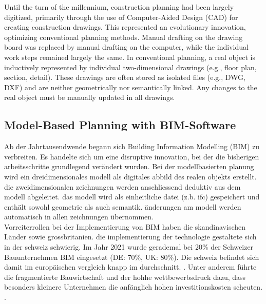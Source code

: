 \begin{English}
    Until the turn of the millennium, construction planning had been largely digitized, primarily through the use of Computer-Aided Design (CAD) for creating construction drawings. This represented an evolutionary innovation, optimizing conventional planning methods. Manual drafting on the drawing board was replaced by manual drafting on the computer, while the individual work steps remained largely the same. In conventional planning, a real object is inductively represented by individual two-dimensional drawings (e.g., floor plan, section, detail). These drawings are often stored as isolated files (e.g., DWG, DXF) and are neither geometrically nor semantically linked. Any changes to the real object must be manually updated in all drawings. \\
\end{English}

\subsection{Model-Based Planning with BIM-Software}
\begin{German}
    Ab der Jahrtausendwende begann sich Building Information Modelling (BIM) zu verbreiten. Es handelte sich um eine disruptive innovation, bei der die bisherigen arbeitsschritte grundlegend verändert wurden. Bei der modellbasierten planung wird ein dreidimensionales modell als digitales abbild des realen objekts erstellt. die zweidimensionalen zeichnungen werden anschliessend deduktiv aus dem modell abgeleitet. das modell wird als einheitliche datei (z.b. ifc) gespeichert und enthält sowohl geometrie als auch semantik. änderungen am modell werden automatisch in allen zeichnungen übernommen. \\
    Vorreiterrollen bei der Implementierung von BIM haben die skandinavischen Länder sowie grossbritanien. die implementierung der technologie gestaltete sich in der schweiz schwierig. Im Jahr 2021 wurde gerademal bei 20\% der Schweizer Bauunternehmen BIM eingesetzt (DE: 70\%, UK: 80\%). Die schweiz befindet sich damit im europäischen vergleich knapp im durchschnitt. \cite{heinrichSchweizImBIMEuropavergleich2022}. Unter anderem führte die fragmentierte Bauwirtschaft und der hohhe wettbewerbsdruck dazu, dass besonders kleinere Unternehmen die anfänglich hohen investitionskosten scheuten. \cite{ivanicErfolgreicheEinfuehrungBuilding2020}. \\
\end{German}


